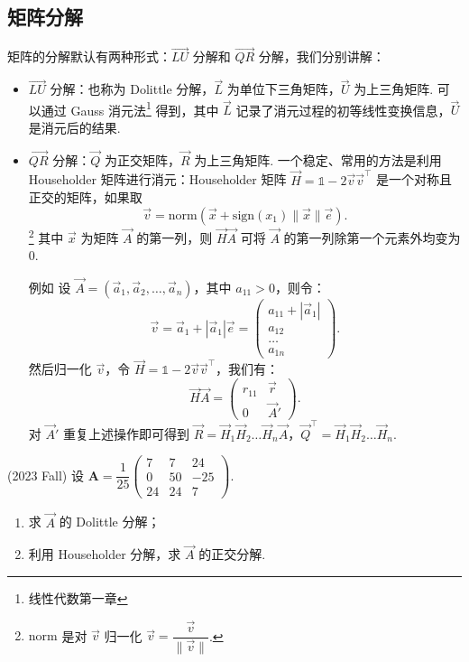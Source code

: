 \subsection*{矩阵分解}
矩阵的分解默认有两种形式：$\vec{LU}$ 分解和 $\vec{QR}$ 分解，我们分别讲解：
\begin{itemize}
    \item $\vec{LU}$ 分解：也称为 Dolittle 分解，$\vec{L}$ 为单位下三角矩阵，$\vec{U}$ 为上三角矩阵. 可以通过 Gauss 消元法\footnote{线性代数第一章} 得到，其中 $\vec{L}$ 记录了消元过程的初等线性变换信息，$\vec{U}$ 是消元后的结果.
    \item $\vec{QR}$ 分解：$\vec{Q}$ 为正交矩阵，$\vec{R}$ 为上三角矩阵. 一个稳定、常用的方法是利用 Householder 矩阵进行消元：Householder 矩阵 $\vec{H} = \mathds{1} - 2\vec{v}\vec{v}^\top$ 是一个对称且正交的矩阵，如果取 
    \[
        \vec{v} = \mathrm{norm}(\vec{x} + \mathrm{sign}(x_1)\|\vec{x}\|\vec{e}).
    \]
    \footnote{$\mathrm{norm}$ 是对 $\vec{v}$ 归一化 $\vec{v} = \dfrac{\vec{v}}{\|\vec{v}\|}$.} 其中 $\vec{x}$ 为矩阵 $\vec{A}$ 的第一列，则 $\vec{H} \vec{A}$ 可将 $\vec{A}$ 的第一列除第一个元素外均变为 $0$.

    例如{\color{red} 设 $\vec{A} = (\vec{a}_1,\vec{a}_2,\dots,\vec{a}_n)$，其中 $a_{11}>0$，则令：
    \[
        \vec{v} = \vec{a}_1 + |\vec{a}_1|\vec{e} = \begin{pmatrix}
            a_{11}+|\vec{a}_1|\\a_{12}\\\ldots \\ a_{1n}
        \end{pmatrix}.
    \]
    然后归一化 $\vec{v}$，令 $\vec{H} = \mathds{1} - 2\vec{v}\vec{v}^\top$，我们有：
    \[
        \vec{H}\vec{A} = \begin{pmatrix}
            r_{11} & \vec{r} \\ 0 & \vec{A}'
        \end{pmatrix}.
    \]
    对 $\vec{A}'$ 重复上述操作即可得到 $\vec{R} = \vec{H}_1\vec{H}_2 \dots\vec{H}_n \vec{A}$，$\vec{Q}^\top = \vec{H}_1\vec{H}_2 \dots\vec{H}_n $.}
\end{itemize}
\begin{problembox}
    \begin{example}
        (2023 Fall) 设 $\mathbf{A} = \dfrac{1}{25}\begin{pmatrix}
            7 & 7 & 24 \\ 0 & 50 & -25 \\ 24 & 24 & 7
        \end{pmatrix}$.
        \begin{enumerate}
            \item 求 $\vec{A}$ 的 Dolittle 分解；
            \item 利用 Householder 分解，求 $\vec{A}$ 的正交分解.
        \end{enumerate}
    \end{example}
    \begin{solution}
        
    \end{solution}
\end{problembox}


